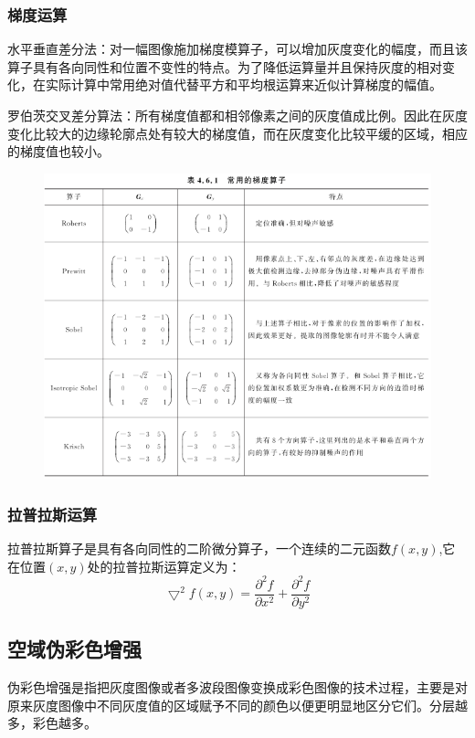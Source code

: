 \documentclass[11pt]{article}
\begin{document}
\subsubsection{梯度运算}
水平垂直差分法：对一幅图像施加梯度模算子，可以增加灰度变化的幅度，而且该算子具有各向同性和位置不变性的特点。为了降低运算量并且保持灰度的相对变化，在实际计算中常用绝对值代替平方和平均根运算来近似计算梯度的幅值。

罗伯茨交叉差分算法：所有梯度值都和相邻像素之间的灰度值成比例。因此在灰度变化比较大的边缘轮廓点处有较大的梯度值，而在灰度变化比较平缓的区域，相应的梯度值也较小。

\begin{figure}[H]
	\centering
	\includegraphics[scale=0.5]{28}
\end{figure}

\subsubsection{拉普拉斯运算}
拉普拉斯算子是具有各向同性的二阶微分算子，一个连续的二元函数$f(x,y)$,它在位置$(x,y)$处的拉普拉斯运算定义为：
$$\bigtriangledown^2f(x,y) = \frac{\partial^2f}{\partial x^2}+\frac{\partial^2f}{\partial y^2}$$

\subsection{空域伪彩色增强}
伪彩色增强是指把灰度图像或者多波段图像变换成彩色图像的技术过程，主要是对原来灰度图像中不同灰度值的区域赋予不同的颜色以便更明显地区分它们。分层越多，彩色越多。
\end{document}
